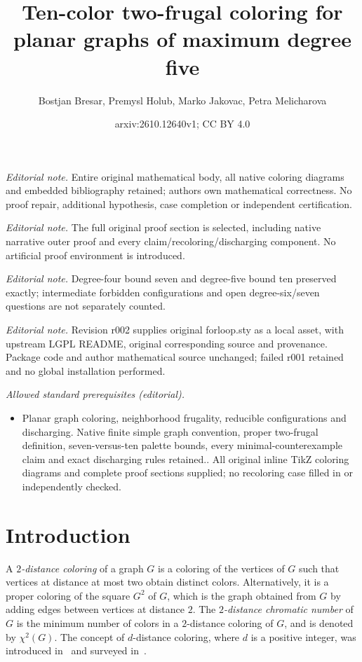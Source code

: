 \documentclass[10pt,a4paper]{article}
\title{Ten-color two-frugal coloring for planar graphs of maximum degree five}
\author{Bostjan Bresar, Premysl Holub, Marko Jakovac, Petra Melicharova}
\date{arxiv:2610.12640v1; CC BY 4.0}
\begin{document}
\maketitle
\noindent\textit{Editorial note.} Entire original mathematical body, all native coloring diagrams and embedded bibliography retained; authors own mathematical correctness. No proof repair, additional hypothesis, case completion or independent certification.\par\medskip
\noindent\textit{Editorial note.} The full original proof section is selected, including native narrative outer proof and every claim/recoloring/discharging component. No artificial proof environment is introduced.\par\medskip
\noindent\textit{Editorial note.} Degree-four bound seven and degree-five bound ten preserved exactly; intermediate forbidden configurations and open degree-six/seven questions are not separately counted.\par\medskip
\noindent\textit{Editorial note.} Revision r002 supplies original forloop.sty as a local asset, with upstream LGPL README, original corresponding source and provenance. Package code and author mathematical source unchanged; failed r001 retained and no global installation performed.\par\medskip
\noindent\textit{Allowed standard prerequisites (editorial).}\begin{itemize}
\item Planar graph coloring, neighborhood frugality, reducible configurations and discharging. Native finite simple graph convention, proper two-frugal definition, seven-versus-ten palette bounds, every minimal-counterexample claim and exact discharging rules retained.. All original inline TikZ coloring diagrams and complete proof sections supplied; no recoloring case filled in or independently checked.
\end{itemize}\medskip
\section{Introduction}
\label{sec:intro}

A {\em $2$-distance coloring} of a graph $G$ is a coloring of the vertices of $G$ such that vertices at distance at most two obtain distinct colors. Alternatively, it is a proper coloring of the square $G^2$ of $G$, which is the graph obtained from $G$ by adding edges between vertices at distance $2$. The {\em $2$-distance chromatic number} of $G$ is the minimum number of colors in a $2$-distance coloring of $G$, and is denoted by $\chi^2(G)$.   The concept of $d$-distance coloring, where $d$ is a positive integer, was introduced in~\cite{Kramer_intro} and surveyed in~\cite{Kramer_surv}.  
\end{document}

